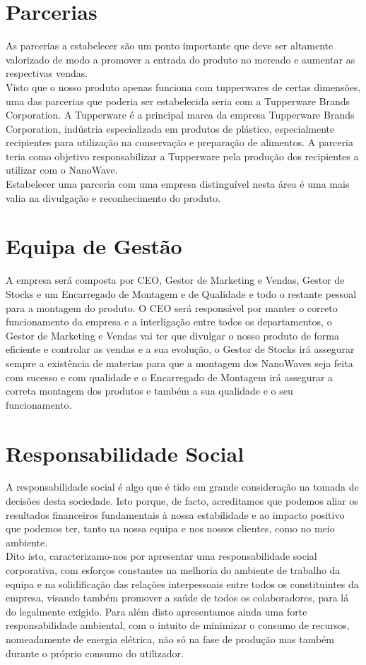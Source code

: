 \documentclass[a4paper]{article}
\begin{document}
\section{Parcerias}
As parcerias a estabelecer são um ponto importante que deve ser altamente valorizado de modo a promover a entrada do produto no mercado e aumentar as respectivas vendas.\\
Visto que o nosso produto apenas funciona com tupperwares de certas dimensões, uma das parcerias que poderia ser estabelecida seria com a Tupperware Brands Corporation. A Tupperware é a principal marca da empresa Tupperware Brands Corporation, indústria especializada em produtos de plástico, especialmente recipientes para utilização na conservação e preparação de alimentos. A parceria teria como objetivo responsabilizar a Tupperware pela produção dos recipientes a utilizar com o NanoWave.\\
Estabelecer uma parceria com uma empresa distinguível nesta área é uma mais valia na divulgação e reconhecimento do produto.

\section{Equipa de Gestão}
A empresa será composta por CEO, Gestor de Marketing e Vendas, Gestor de Stocks e um Encarregado de Montagem e de Qualidade e todo o restante pessoal para a montagem do produto. O CEO será responsável por manter o correto funcionamento da empresa e a interligação entre todos os departamentos, o Gestor de Marketing e Vendas vai ter que divulgar o nosso produto de forma eficiente e controlar as vendas e a sua evolução, o Gestor de Stocks irá assegurar sempre a existência de materias para que a montagem dos NanoWaves seja feita com sucesso e com qualidade e o Encarregado de Montagem irá assegurar a correta montagem dos produtos e também a sua qualidade e o seu funcionamento.

\section{Responsabilidade Social}
A responsabilidade social é algo que é tido em grande consideração na tomada de decisões desta sociedade. Isto porque, de facto, acreditamos que podemos aliar os resultados financeiros fundamentais à nossa estabilidade e ao impacto positivo que podemos ter, tanto na nossa equipa e nos nossos clientes, como no meio ambiente.\\
Dito isto, caracterizamo-nos por apresentar uma responsabilidade social corporativa, com esforços constantes na melhoria do ambiente de trabalho da equipa e na solidificação das relações interpessoais entre todos os constituintes da empresa, visando também promover a saúde de todos os colaboradores, para lá do legalmente exigido. Para além disto apresentamos ainda uma forte responsabilidade ambiental, com o intuito de minimizar o consumo de recursos, nomeadamente de energia elétrica, não só na fase de produção mas também durante o próprio consumo do utilizador.
\end{document}
